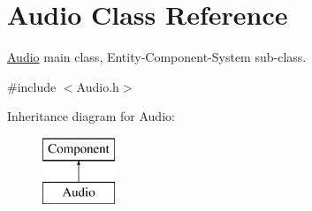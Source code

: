 \hypertarget{class_audio}{}\section{Audio Class Reference}
\label{class_audio}


\mbox{\hyperlink{class_audio}{Audio}} main class, Entity-\/\+Component-\/\+System sub-\/class.  




{\ttfamily \#include $<$Audio.\+h$>$}

Inheritance diagram for Audio\+:\begin{figure}[H]
\begin{center}
\leavevmode
\includegraphics[height=2.000000cm]{class_audio}
\end{center}
\end{figure}
